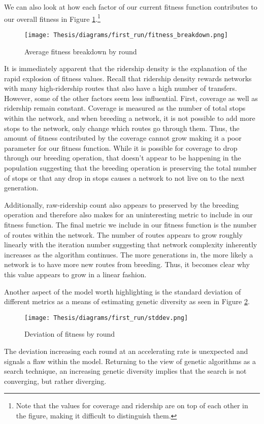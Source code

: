 \documentclass[11pt]{amsart}
\theoremstyle{definition}                  %
\theoremstyle{remark}                       %
\numberwithin{equation}{section}
\begin{document}
We can also look at how each factor of our current fitness function contributes to our overall fitness in Figure \ref{fig:first_run_fitness_breakdown}.\footnote{Note that the values for coverage and ridership are on top of each other in the figure, making it difficult to distinguish them.}

\begin{figure}[h]
    \centering
    \texttt{[image: Thesis/diagrams/first\_run/fitness\_breakdown.png]}
    \caption{Average fitness breakdown by round}
    \label{fig:first_run_fitness_breakdown}
\end{figure}

It is immediately apparent that the ridership density is the explanation of the rapid explosion of fitness values. Recall that ridership density rewards networks with many high-ridership routes that also have a high number of transfers. However, some of the other factors seem less influential. First, coverage as well as ridership remain constant. Coverage is measured as the number of total stops within the network, and when breeding a network, it is not possible to add more stops to the network, only change which routes go through them. Thus, the amount of fitness contributed by the coverage cannot grow making it a poor parameter for our fitness function. While it is possible for coverage to drop through our breeding operation, that doesn't appear to be happening in the population suggesting that the breeding operation is preserving the total number of stops or that any drop in stops causes a network to not live on to the next generation.  

Additionally, raw-ridership count also appears to preserved by the breeding operation and therefore also makes for an uninteresting metric to include in our fitness function. The final metric we include in our fitness function is the number of routes within the network. The number of routes appears to grow roughly linearly with the iteration number suggesting that network complexity inherently increases as the algorithm continues. The more generations in, the more likely a network is to have more new routes from breeding. Thus, it becomes clear why this value appears to grow in a linear fashion. 

Another aspect of the model worth highlighting is the standard deviation of different metrics as a means of estimating genetic diversity as seen in Figure \ref{fig:first_run_stddev}. 
\begin{figure}[h]
    \centering
    \texttt{[image: Thesis/diagrams/first\_run/stddev.png]}
    \caption{Deviation of fitness by round}
    \label{fig:first_run_stddev}
\end{figure}
The deviation increasing each round at an accelerating rate is unexpected and signals a flaw within the model. Returning to the view of genetic algorithms as a search technique, an increasing genetic diversity implies that the search is not converging, but rather diverging. 
\end{document}
